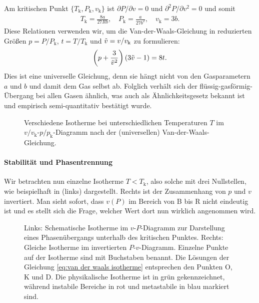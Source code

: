 Am kritischen Punkt $\{T_\mathrm{k},P_\mathrm{k},v_\mathrm{k}\}$ ist ${\partial P}/{\partial v} = 0$ und ${\partial^2 P}/{\partial v^2}=0$ und somit
\begin{align*}
    T_\mathrm{k}=\frac{8a}{27Rb}, \quad P_\mathrm{k}=\frac{a}{27b^2},\quad v_\mathrm{k}=3b.
\end{align*}
Diese Relationen verwenden wir, um die Van-der-Waals-Gleichung in reduzierten Größen $p=P/P_\mathrm{k}$, $t=T/T_\mathrm{k}$ und $\Tilde{v}=v/v_\mathrm{k}$ zu formulieren:
\begin{align}
    \label{eq:van der waals reduziert}
    \left( p+\frac{3}{\Tilde{v}^2} \right)(3\Tilde{v}-1) = 8t.
\end{align}
Dies ist eine universelle Gleichung, denn sie hängt nicht von den Gasparametern $a$ und $b$ und damit dem Gas selbst ab. Folglich verhält sich der flüssig-gasförmig-Übergang bei allen Gasen ähnlich, was auch als Ähnlichkeitsgesetz bekannt ist und empirisch semi-quantitativ bestätigt wurde.

\begin{figure}[htbp]
    \centering
    \tfigVanDerWaalsIsotherm
    \caption{Verschiedene Isotherme bei unterschiedlichen Temperaturen $T$ im $v/v_\mathrm{k}$-$p/p_\mathrm{k}$-Diagramm nach der (universellen) Van-der-Waals-Gleichung. }
    \label{fig:VanDerWaalsIsotherm}
\end{figure}


\paragraph*{Stabilität und Phasentrennung}

Wir betrachten nun einzelne Isotherme $T<T_\mathrm{k}$, also solche mit drei Nullstellen, wie beispielhaft in  (links) dargestellt. Rechts ist der Zusammenhang von $p$ und $v$ invertiert. Man sieht sofort, dass $v(P)$ im Bereich von B bis R nicht eindeutig ist und es stellt sich die Frage, welcher Wert dort nun wirklich angenommen wird.

\begin{figure}[htbp]
    \centering
    \tfigPhaseSeparation
    \tfigPhaseSeparationInverted
    \caption{Links: Schematische Isotherme im $v$-$P$-Diagramm zur Darstellung eines Phasenübergangs unterhalb des kritischen Punktes. Rechts: Gleiche Isotherme im invertierten $P$-$v$-Diagramm.
        Einzelne Punkte auf der Isotherme sind mit Buchstaben benannt. Die Lösungen der Gleichung \eqref{eq:van der waals isotherme} entsprechen den Punkten O, K und D. Die physikalische Isotherme ist in grün gekennzeichnet, während instabile Bereiche in rot und metastabile in blau markiert sind. }
    \label{fig:PhaseSeparation}
\end{figure}


